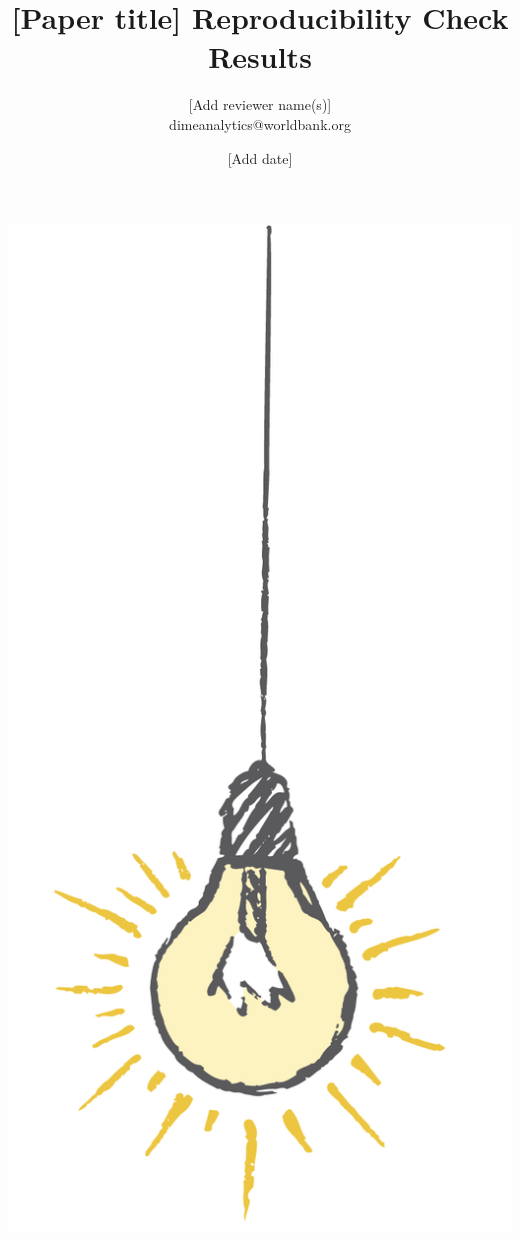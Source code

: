 \documentclass{tufte-handout}
\title{[Paper title] \newline Reproducibility Check Results}
\author{[Add reviewer name(s)] \\ dimeanalytics@worldbank.org}
\date{[Add date]}
\begin{document}
\maketitle%

\begin{marginfigure}%
  \includegraphics[width=\linewidth]{light.png}
\end{marginfigure}
\end{document}
